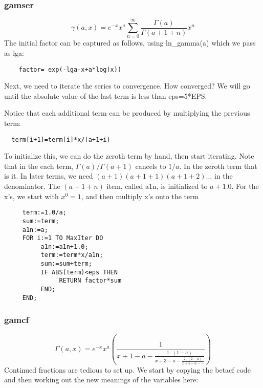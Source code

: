 \subsubsection*{gamser}
\begin{equation}
  \gamma(a,x) = e^{-x}x^a\sum_{n=0}^\infty
                    \frac{\Gamma(a)}{\Gamma(a+1+n)}x^n
\end{equation}
The initial factor can be captured as follows, using ln\_gamma(a)
which we pass as lga:
\begin{verbatim}
    factor= exp(-lga-x+a*log(x))
\end{verbatim}
Next, we need to iterate the series to convergence.  How
converged?  We will go until the absolute value of the last
term is less than eps=5*EPS.

Notice that each additional term can be produced by multiplying the
previous term:
\begin{verbatim}
  term[i+1]=term[i]*x/(a+1+i)
\end{verbatim}

To initialize this, we can do the zeroth term by hand, then
start iterating.  Note that in the each term,
$\Gamma(a)/\Gamma(a+1)$ cancels to $1/a$.  In the zeroth term that
is it.  In later terms, we need $(a+1)(a+1+1)(a+1+2)\dots$ in
the denominator.  The $(a+1+n)$ item, called a1n, is
initialized to $a+1.0$.  For the x's, we start with $x^0=1$, and
then multiply x's onto the term
\begin{verbatim}
     term:=1.0/a;
     sum:=term;
     a1n:=a;
     FOR i:=1 TO MaxIter DO
          a1n:=a1n+1.0;
          term:=term*x/a1n;
          sum:=sum+term;
          IF ABS(term)<eps THEN
               RETURN factor*sum
          END;
     END;
\end{verbatim}

\subsubsection*{gamcf}
\begin{equation}
  \Gamma(a,x) = e^{-x}x^a \left(
                    \frac{1}{\displaystyle x+1-a 
                    - \frac{1\cdot(1-a)}{\displaystyle x+3-a
                      - \frac{2\cdot(2-a)}{\displaystyle x+5-a
                        - \cdots}}}
                    \right)
\end{equation}
Continued fractions are tedious to set up.
We start by copying the betacf code and then
working out the new meanings of the variables here:

